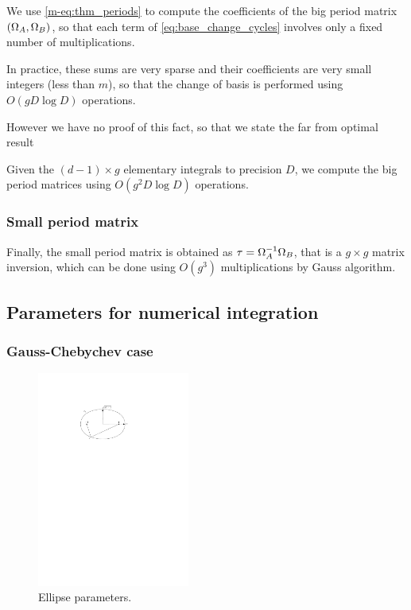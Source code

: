 \documentclass[main.tex]{subfiles}
\begin{document}
   We use \eqref{m-eq:thm_periods} to compute the coefficients of the big period
   matrix $(\Omega_A,\Omega_B)$, so that each term of \eqref{eq:base_change_cycles}
   involves only a fixed number of multiplications.

   In practice, these sums are very sparse and their coefficients are very small integers
   (less than $m$), so that the change of basis is performed using $O(gD\log D)$ operations.

   However we have no proof of this fact, so that we state the far from optimal
   result
   \begin{thm}
       Given the $(d-1)\times g$ elementary integrals to precision $D$,
       we compute the big period matrices using $O(g^2D\log D)$ operations.
   \end{thm}

   \subsubsection{Small period matrix}

   Finally, the small period matrix is obtained as $\tau=\Omega_A^{-1}\Omega_B$,
   that is a $g\times g$ matrix inversion, which can be done using
   $O(g^3)$ multiplications by Gauss algorithm.

 \subsection{Parameters for numerical integration}

  \subsubsection{Gauss-Chebychev case}

  \begin{figure}[H] \begin{center}
      \includegraphics[width=5cm]{images/ellipse.pdf}
  \end{center} \caption{Ellipse parameters.}
  \label{fig:ellipse} \end{figure}
\end{document}
